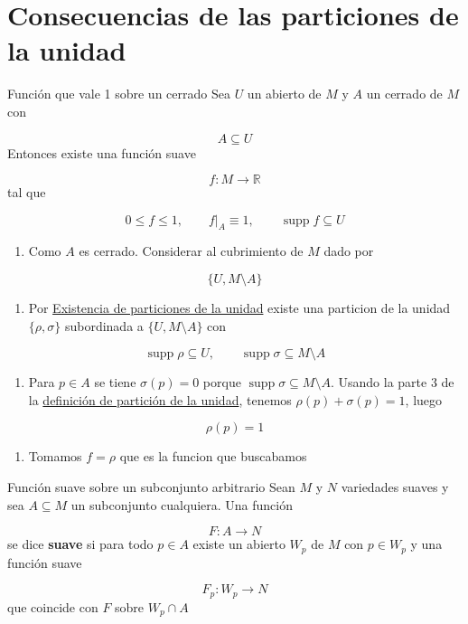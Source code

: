 \section{Consecuencias de las particiones de la unidad}
\begin{bookcorollary}{Función que vale 1 sobre un cerrado}
Sea $U$ un abierto de $M$ y $A$ un cerrado de $M$ con

\[
A\subseteq U
\]
Entonces existe una función suave

\[
f:M\to\mathbb R
\]
tal que

\[
0\le f\le 1,\qquad f|_A\equiv 1,\qquad \operatorname{supp}f\subseteq U
\]
\end{bookcorollary}
\begin{bookproof}{}
\begin{enumerate}
\item Como $A$ es cerrado. Considerar al cubrimiento de $M$ dado por
\end{enumerate}
\[
\{U,M\setminus A\}
\]
\begin{enumerate}[start=2]
\item Por \hyperref[blk:eafe2b]{Existencia de particiones de la unidad} existe una particion de la unidad $\{\rho,\sigma\}$ subordinada a $\{U,M\setminus A\}$ con
\end{enumerate}
\[
\operatorname{supp}\rho\subseteq U,\qquad \operatorname{supp}\sigma\subseteq M\setminus A
\]
\begin{enumerate}[start=3]
\item Para $p\in A$ se tiene $\sigma(p)=0$ porque $\operatorname{supp}\sigma\subseteq M\setminus A$. Usando la parte 3 de la \hyperref[blk:f5db1b]{definición de partición de la unidad}, tenemos $\rho(p)+\sigma(p)=1$, luego
\end{enumerate}
\[
\rho(p)=1
\]
\begin{enumerate}[start=4]
\item Tomamos $f=\rho$ que es la funcion que buscabamos
\end{enumerate}
\bookqed
\end{bookproof}
\begin{bookdefinition}{Función suave sobre un subconjunto arbitrario}
Sean $M$ y $N$ variedades suaves y sea $A\subseteq M$ un subconjunto cualquiera. Una función

\[
F:A\to N
\]
se dice \textbf{suave} si para todo $p\in A$ existe un abierto $W_p$ de $M$ con $p\in W_p$ y una función suave

\[
F_p:W_p\to N
\]
que coincide con $F$ sobre $W_p\cap A$

\end{bookdefinition}
